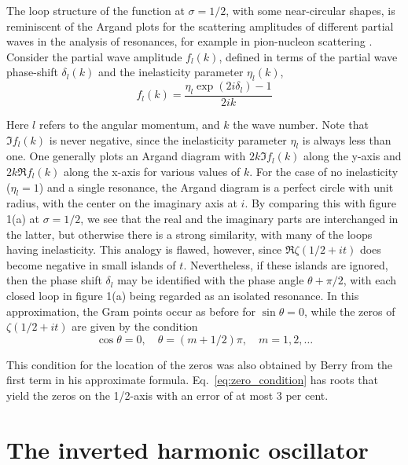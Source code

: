 \documentclass[11pt]{article}
\theoremstyle{plain}
\begin{document}
The loop structure of the function at $\sigma = 1/2$, with some near-circular shapes, is reminiscent of the Argand plots for the scattering amplitudes of different partial waves in the analysis of resonances, for example in pion-nucleon scattering \cite{bhaduri1988}. Consider the partial wave amplitude $f_l(k)$, defined in terms of the partial wave phase-shift $\delta_l(k)$ and the inelasticity parameter $\eta_l(k)$,
\begin{equation}
f_l(k) = \frac{\eta_l \exp(2i\delta_l) - 1}{2ik}
\label{eq:scattering_amplitude}
\end{equation}

Here $l$ refers to the angular momentum, and $k$ the wave number. Note that $\Im f_l(k)$ is never negative, since the inelasticity parameter $\eta_l$ is always less than one. One generally plots an Argand diagram with $2k\Im f_l(k)$ along the y-axis and $2k \Re f_l(k)$ along the x-axis for various values of $k$. For the case of no inelasticity ($\eta_l = 1$) and a single resonance, the Argand diagram is a perfect circle with unit radius, with the center on the imaginary axis at $i$. By comparing this with figure 1(a) at $\sigma = 1/2$, we see that the real and the imaginary parts are interchanged in the latter, but otherwise there is a strong similarity, with many of the loops having inelasticity. This analogy is flawed, however, since $\Re\zeta(1/2 + it)$ does become negative in small islands of $t$. Nevertheless, if these islands are ignored, then the phase shift $\delta_l$ may be identified with the phase angle $\theta + \pi/2$, with each closed loop in figure 1(a) being regarded as an isolated resonance. In this approximation, the Gram points occur as before for $\sin \theta = 0$, while the zeros of $\zeta(1/2+ it)$ are given by the condition
\begin{equation}
\cos \theta = 0, \quad \theta = (m + 1/2)\pi, \quad m = 1,2,\ldots
\label{eq:zero_condition}
\end{equation}

This condition for the location of the zeros was also obtained by Berry \cite{berry1985} from the first term in his approximate formula. Eq.~\eqref{eq:zero_condition} has roots that yield the zeros on the 1/2-axis with an error of at most 3 per cent.

\section{The inverted harmonic oscillator}
\end{document}
